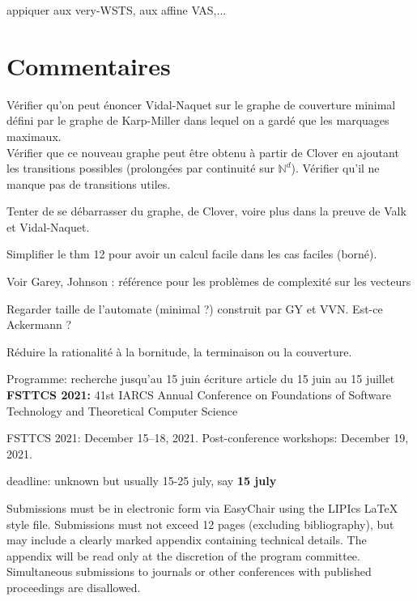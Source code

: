 \documentclass[a4paper,final]{article}
\theoremstyle{definition}
\newcommand{\N}{\ensuremath{\mathbb{N}}}
\begin{document}
appiquer aux very-WSTS, aux affine VAS,...

\section{Commentaires}
Vérifier qu'on peut énoncer Vidal-Naquet sur le graphe de couverture minimal défini par le graphe de Karp-Miller dans lequel on a gardé que les marquages maximaux.\\
Vérifier que ce nouveau graphe peut être obtenu à partir de Clover en ajoutant les transitions possibles (prolongées par continuité sur $\N^d$). Vérifier qu'il ne manque pas de transitions utiles.

Tenter de se débarrasser du graphe, de Clover, voire plus dans la preuve de Valk et Vidal-Naquet.

Simplifier le thm 12 pour avoir un calcul facile dans les cas faciles (borné).

Voir Garey, Johnson : référence pour les problèmes de complexité sur les vecteurs

Regarder taille de l'automate (minimal ?) construit par GY et VVN. Est-ce Ackermann ?


Réduire la rationalité à la bornitude, la terminaison ou la couverture.

Programme:
recherche jusqu'au 15 juin
écriture article du 15 juin au 15 juillet \\

{\bf FSTTCS 2021:}  
41st IARCS Annual Conference on
Foundations of Software Technology and Theoretical Computer Science

    FSTTCS 2021: December 15–18, 2021.
    Post-conference workshops: December 19, 2021.

deadline: unknown but usually 15-25 july, say {\bf 15 july}

Submissions must be in electronic form via EasyChair using the LIPIcs LaTeX style file. Submissions must not exceed 12 pages (excluding bibliography), but may include a clearly marked appendix containing technical details. The appendix will be read only at the discretion of the program committee. Simultaneous submissions to journals or other conferences with published proceedings are disallowed. 
\end{document}
